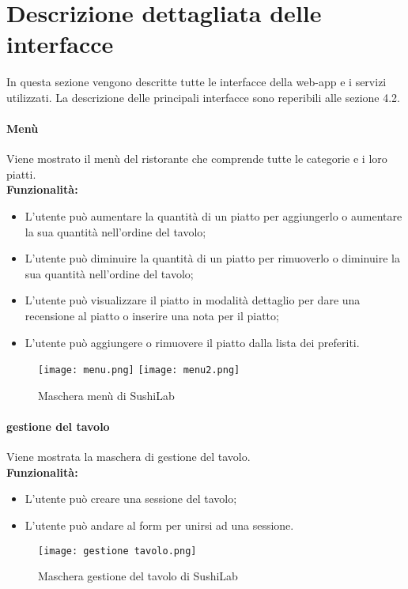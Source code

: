 \label{cap:appendice c}
\chapter{Descrizione dettagliata delle interfacce}
In questa sezione vengono descritte tutte le interfacce della web-app e i servizi utilizzati. La descrizione delle principali interfacce sono reperibili alle sezione 4.2.
\subsubsection{Menù}
Viene mostrato il menù del ristorante che comprende tutte le categorie e i loro piatti.\\
\textbf{Funzionalità:}
\begin{itemize}
    \item L'utente può aumentare la quantità di un piatto per aggiungerlo o aumentare la sua quantità nell'ordine del tavolo;
    \item L'utente può diminuire la quantità di un piatto per rimuoverlo o diminuire la sua quantità nell'ordine del tavolo;
    \item L'utente può visualizzare il piatto in modalità dettaglio per dare una recensione al piatto o inserire una nota per il piatto;
    \item L'utente può aggiungere o rimuovere il piatto dalla lista dei preferiti.
\end{itemize}
\begin{figure}[H]
    \centering
    \texttt{[image: menu.png]}
    \texttt{[image: menu2.png]}
    \caption{Maschera menù di SushiLab}
\end{figure}
\pagebreak

\subsubsection{gestione del tavolo}
Viene mostrata la maschera di gestione del tavolo.\\
\textbf{Funzionalità:}
\begin{itemize}
    \item L'utente può creare una sessione del tavolo;
    \item L'utente può andare al form per unirsi ad una sessione.
\end{itemize}
\begin{figure}[H]
    \centering
    \texttt{[image: gestione tavolo.png]}
    \caption{Maschera gestione del tavolo di SushiLab}
\end{figure}
\pagebreak

